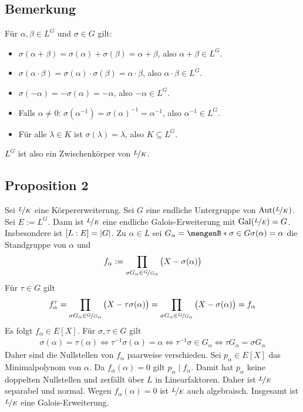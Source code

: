 \subsection[Bemerkung: Begründung warum der Fixkörper ein Körper ist]{Bemerkung} %
\label{sub:175}
Für $\alpha, \beta \in L^G$ und $\sigma \in G$ gilt: 
\begin{itemize}
	\item $\sigma(\alpha + \beta)= \sigma(\alpha)+ \sigma(\beta)= \alpha + \beta$, also $\alpha+ \beta \in L^G$.
	\item $\sigma(\alpha \cdot \beta) = \sigma(\alpha) \cdot \sigma(\beta) = \alpha \cdot  \beta$, also $\alpha \cdot \beta \in L^G$.
	\item $\sigma(-\alpha)= - \sigma(\alpha) = - \alpha$, also $- \alpha \in L^G$.
	\item Falls $\alpha \not= 0$: $ \sigma(\alpha ^{-1}) = \sigma(\alpha) ^{-1} = \alpha ^{-1}$, also $\alpha ^{-1} \in L^G$.
	\item Für alle $\lambda  \in K$ ist $\sigma(\lambda )=\lambda$, also $K \subseteq L^G$.
\end{itemize}
$L^G$ ist also ein Zwischenkörper von $\nicefrac{L}{K}$.

\subsection[Proposition 2: Die Galois-Gruppe zu $L^G$ ist gleich der Untergruppe $G \le \Aut(\nicefrac{L}{K})$]{Proposition 2} %
\label{sub:176}
Sei $\nicefrac{L}{K}$ eine Körpererweiterung. Sei $G$ eine endliche Untergruppe von $\Aut(\nicefrac{L}{K})$. Sei $E:= L^G$. Dann ist $\nicefrac{L}{E}$ eine
endliche Galois-Erweiterung mit $\Gal(\nicefrac{L}{E}) = G$. Insbesondere ist $[L:E]= \abs*{G} $.
Zu $\alpha \in L$ sei $G_\alpha = \set[\sigma \in G]{\sigma(\alpha)=\alpha}$ die Standgruppe von $\alpha$ und 
\[
	f_\alpha := \prod_{\sigma G_\alpha \in \nicefrac{G}{G_\alpha}} \big(X-\sigma(\alpha)\big)
\]
Für $\tau \in G$ gilt 
\[
	f^\tau_\alpha = \prod_{\sigma G_\alpha \in \nicefrac{G}{G_\alpha}} \big(X-\tau\sigma(\alpha)\big) = \prod_{\sigma G_\alpha \in \nicefrac{G}{G_\alpha}} \big(X-\sigma(\alpha)\big)= f_\alpha
\]
Es folgt $f_\alpha \in E[X]$. Für $\sigma, \tau \in G$ gilt 
\begin{align*}
	\sigma(\alpha)=\tau(\alpha) \iff \tau ^{-1} \sigma(\alpha)= \alpha \iff \tau ^{-1} \sigma \in G_\alpha 
	\iff \tau G_\alpha = \sigma G_\alpha
\end{align*}
Daher sind die Nullstellen von $f_\alpha$ paarweise verschieden. Sei $p_\alpha \in E[X]$ das Minimalpolynom von $\alpha$. Da $f_\alpha(\alpha)=0$ gilt 
$p_\alpha \mid f_\alpha$. Damit hat $p_\alpha$ keine doppelten Nullstellen und zerfällt über $L$ in Linearfaktoren. Daher ist $\nicefrac{L}{E}$ separabel und normal.
Wegen $f_\alpha(\alpha)=0$ ist $\nicefrac{L}{E}$ auch algebraisch. Insgesamt ist $\nicefrac{L}{E}$ eine Galois-Erweiterung.

